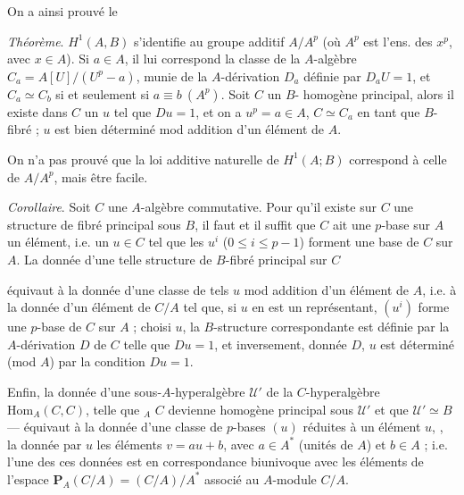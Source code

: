 \documentclass[11pt,a4paper]{article}
\begin{document}
On a ainsi prouvé le

\emph{Théorème}. $H^1(A, B)$ s'identifie  au groupe additif
$A/A^p$ (où $A^p$ est l'ens. des $x^p$, avec $x \in A$). Si \struck{\ill{}}
$a \in A$, il lui correspond la classe
de la $A$-algèbre $C_a = A[U]/(U^p - a)$, munie de la $A$-dérivation $D_a$
définie par $D_a U = 1$, et $C_a \simeq C_b$ si et seulement si
$a \equiv b \ (A^p)$. Soit $C$ un $B$- homogène principal,
alors il existe dans $C$ un \struck{\ill{}} $u$ tel que $Du = 1$, et
 on a $u^p = a \in A$, $C \simeq C_a$ en tant
que  $B$-fibré ; $u$ est bien déterminé mod addition d'un
élément de $A$.

On n'a pas prouvé que la loi additive naturelle de $H^1(A; B)$ correspond à
celle de $A/A^p$, mais \ill{} \ill{}  être 
facile.

\emph{Corollaire}. Soit $C$ une $A$-algèbre commutative. Pour
 qu'il existe sur $C$ une structure de fibré  principal sous
$B$, il faut
et il suffit que $C$ ait une $p$-base sur $A$  
un élément, i.e. un $u \in C$ tel que les $u^i$ ($0 \leq i \leq p-1$)
forment une base de $C$ sur $A$. La donnée d'une telle structure de
$B$-fibré  principal sur $C$


équivaut à la donnée d'une classe de tels $u$ mod addition d'un élément de
$A$, i.e. à la donnée d'un élément de $C/A$ tel que, si $u$ en est un
représentant, $(u^i)$ forme une $p$-base de $C$ sur $A$ ; choisi $u$, la
$B$-structure correspondante est définie par la $A$-dérivation $D$ de $C$
telle que $Du = 1$, et inversement, donnée $D$, $u$ est déterminé (mod $A$)
par la condition $Du = 1$.

Enfin, la donnée d'une 
sous-$A$-hyperalgèbre
$\mathcal{U}'$ de
la $C$-hyperalgèbre  
$\mathrm{Hom}_A(C, C)$, telle que \ill{}${}_A$ $C$ devienne
\struck{\ill{}} homogène principal sous $\mathcal{U}'$ et que
$\mathcal{U}' \simeq B$ --- équivaut à la donnée d'une
 classe de $p$-bases $(u)$ réduites à un élément $u$, \ill{}
 \ill{}, la \ill{} donnée par $u$ \ill{} les
éléments $v = au + b$, avec $a \in A^*$ (unités de $A$) et $b \in A$ ; i.e.
l'une des ces données est en correspondance biunivoque avec les éléments
de l'espace 
$\mathbf{P}_A(C/A) = (C/A)/A^*$ associé au $A$-module $C/A$.
\end{document}
